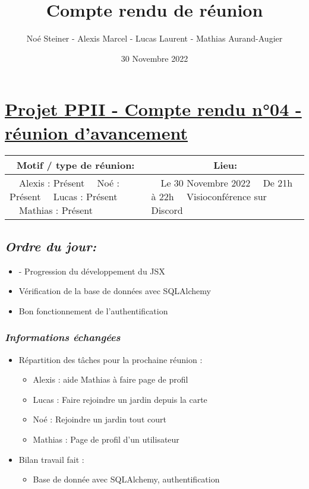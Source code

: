 \documentclass[french,a4paper]{article}
\author{Noé Steiner - Alexis Marcel - Lucas Laurent - Mathias Aurand-Augier}
\date{30 Novembre 2022}
\newcommand{\tabitem}{\textbullet~~}\title{Compte rendu de réunion}
\begin{document}
\maketitle

\section*{\underline{Projet PPII - Compte rendu n°04 - réunion d'avancement}}

\begin{table}[!htb]
  \centering
  \begin{tabular}{| p{7cm} | p{7cm} |}
    \hline
    \multicolumn{1}{|c|}{ Motif / type de réunion:} & \multicolumn{1}{c|}{Lieu:} \\
    \hline
    \tabitem Alexis : Présent\newline
    \tabitem Noé : Présent\newline
    \tabitem Lucas : Présent\newline
    \tabitem Mathias : Présent                      &
    \tabitem Le 30 Novembre 2022\newline
    \tabitem De 21h à 22h\newline
    \tabitem Visioconférence sur Discord                                         \\
    \hline
  \end{tabular}
\end{table}

\subsection*{\textit{Ordre du jour:}}

\begin{itemize}
  \item - Progression du développement du JSX
  \item Vérification de la base de données avec SQLAlchemy
  \item Bon fonctionnement de l’authentification
\end{itemize}

\subsubsection*{\textit{Informations échangées}}
\begin{itemize}
  \item Répartition des tâches pour la prochaine réunion :
    \begin{itemize}
      \item Alexis : aide Mathias à faire page de profil
      \item Lucas : Faire rejoindre un jardin depuis la carte
      \item Noé : Rejoindre un jardin tout court
      \item Mathias : Page de profil d'un utilisateur
    \end{itemize}
  \item Bilan travail fait : 
    \begin{itemize}
      \item Base de donnée avec SQLAlchemy, authentification
    \end{itemize}
\end{itemize}
\end{document}
